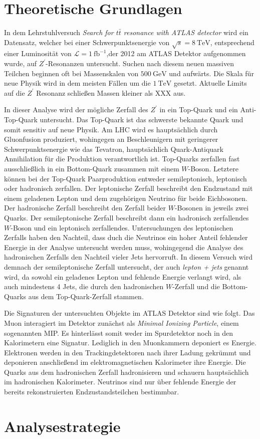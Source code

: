 \section{Theoretische Grundlagen}

In dem Lehrstuhlversuch \textit{Search for $t\bar{t}$ resonance with ATLAS detector} wird ein Datensatz, welcher bei 
einer Schwerpunktsenergie von $\sqrt{s} = \SI{8}{\tera\electronvolt}$, entsprechend einer Luminosität von 
$\mathcal{L} = \SI{1}{\femto\barn}^{-1}$,der 2012 am ATLAS Detektor aufgenommen wurde, auf $Z^\prime$-Resonanzen untersucht. 
Suchen nach diesem neuen massiven Teilchen beginnen oft bei Massenskalen von $\SI{500}{\giga\electronvolt}$ und aufwärts. Die 
Skala für neue Physik wird in dem meisten Fällen um die $\SI{1}{\tera\electronvolt}$ gesetzt. Aktuelle Limits auf die 
$Z^\prime$ Resonanz schließen Massen kleiner als XXX aus. \par 

In dieser Analyse wird der mögliche Zerfall des $Z^\prime$ in ein Top-Quark und ein Anti-Top-Quark untersucht. Das Top-Quark 
ist das schwerste bekannte Quark und somit sensitiv auf neue Physik. Am LHC wird es hauptsächlich durch Gluonfusion 
produziert, wohingegen an Beschleunigern mit geringerer Schwerpunktsenergie wie das Tevatron, hauptsächlich Quark-Antiquark 
Annihilation für die Produktion verantwortlich ist. Top-Quarks 
zerfallen fast ausschließlich in ein Bottom-Quark zusammen mit einem $W$-Boson. Letztere können bei der 
Top-Quark Paarproduktion entweder semileptonisch, 
leptonisch oder hadronisch zerfallen. Der leptonische Zerfall beschreibt den Endzustand mit einem geladenen Lepton und 
dem zugehörigen Neutrino für beide Eichbosonen. Der hadronische Zerfall beschreibt den Zerfall beider $W$-Bosonen in 
jeweils zwei Quarks. Der semileptonische Zerfall beschreibt dann ein hadronisch zerfallendes $W$-Boson und ein leptonisch 
zerfallendes. Untersuchungen des leptonischen Zerfalls haben den Nachteil, dass duch die Neutrinos ein hoher Anteil fehlender 
Energie in der Analyse untersucht werden muss, wohingegend die Analyse des hadronischen Zerfalls den Nachteil vieler Jets 
hervorruft. In diesem Versuch wird demnach der semileptonische Zerfall untersucht, der auch \textit{lepton + jets} genannt wird, 
da sowohl ein geladenes Lepton und fehlende Energie verlangt wird, als auch mindestens 4 Jets, die durch den hadronischen $W$-Zerfall und die Bottom-Quarks 
aus dem Top-Quark-Zerfall stammen. \par 

Die Signaturen der untersuchten Objekte im ATLAS Detektor sind wie folgt. Das Muon interagiert im Detektor zunächst als \textit{Minimal Ionizing Particle}, 
einem sogenannten MIP. Es hinterlässt somit weder im Spurdetektor noch in den Kalorimetern eine Signatur. Lediglich in den Muonkammern deponiert es 
Energie. Elektronen werden in den Trackingdetektoren nach ihrer Ladung gekrümmt und deponieren anschließend im elektromagnetischen Kalorimeter ihre 
Energie. Die Quarks aus dem hadronischen Zerfall hadronisieren und schauern hauptsächlich im hadronischen Kalorimeter. Neutrinos sind nur über fehlende 
Energie der bereits rekonstruierten Endzustandsteilchen bestimmbar.

\section{Analysestrategie}

